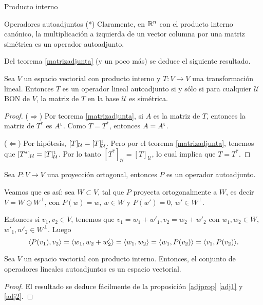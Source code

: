 \begin{chapter}{Producto interno}
\begin{section}{Operadores autoadjuntos (*)}
        Claramente, en $\mathbb R^n$ con el producto interno canónico,  la multiplicación a izquierda de un vector columna por una matriz simétrica es un operador autoadjunto.  
        
        Del  teorema \ref{matrizadjunta} (y un  poco más) se deduce el siguiente resultado.
        
        \begin{proposicion}\label{auto-impl-sim}
            Sea $V$ un espacio vectorial con producto interno y $T: V \to V$ una transformación lineal. Entonces $T$ es un operador lineal autoadjunto si y sólo si para cualquier $\mathcal{U}$ BON de $V$, la matriz de $T$ en la base $\mathcal{U}$  es simétrica.
        \end{proposicion}
        \begin{proof}
            ($\Rightarrow$) Por teorema \ref{matrizadjunta}, si $A$ es la matriz de $T$, entonces  la  matriz de $T^*$ es $A^{\operatorname{t}}$. Como $T=T^*$, entonces $A = A^{\operatorname{t}}$.
            
            ($\Leftarrow$) Por hipótesis, $[T]_\mathcal{U} =[T]_\mathcal{U}^{\operatorname{t}} $. Pero por el teorema \ref{matrizadjunta}, tenemos que  $[T^*]_\mathcal{U} =[T]_\mathcal{U}^{\operatorname{t}}$. Por lo tanto $[T^*]_\mathcal{U} = [T]_\mathcal{U}$, lo cual implica que  $T= T^*$.
        \end{proof}
        
        \begin{ejemplo}\label{poautoadjunto} Sea $P:V \to V$ una proyección ortogonal,  entonces $P$ es un operador  autoadjunto. 
            
            Veamos que es así: sea $W\subset V$, tal que $P$ proyecta ortogonalmente a $W$,  es decir $V = W \oplus W^\perp$, con $P(w) = w$, $w \in W$ y $P(w')= 0$, $w' \in W^\perp$. 
            
            Entonces si $v_1,v_2 \in V$, tenemos que $v_1 = w_1 + w'_1,  v_2 = w_2 + w'_2$ con $w_1,w_2 \in W$, $w'_1,w'_2 \in W^\perp$. Luego
            $$
            \langle P(v_1),v_2 \rangle = \langle w_1, w_2+w'_2 \rangle = \langle w_1,w_2\rangle = \langle w_1, P(v_2) \rangle = \langle v_1, P(v_2) \rangle. 
            $$
        \end{ejemplo}
        
        
        \begin{proposicion}
            Sea $V$ un espacio vectorial con producto interno. Entonces, el  conjunto de operadores lineales autoadjuntos es un espacio vectorial.  
        \end{proposicion}
        \begin{proof}
            El resultado se deduce fácilmente de  la proposición  \ref{adjprop} \ref{adj1} y   \ref{adj2}.
        \end{proof}
        

\end{section}
\end{chapter}
